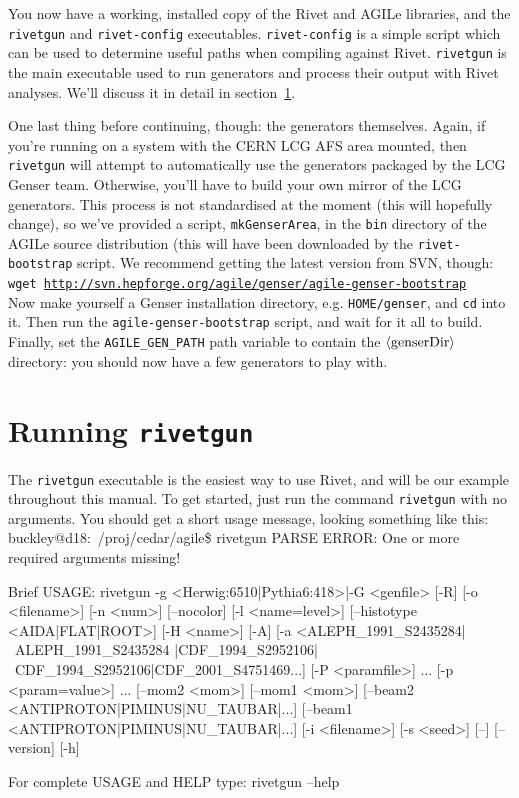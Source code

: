 \documentclass{JHEP3}
\newenvironment{snippet}{\Verbatim}{\endVerbatim}
\newcommand{\kbd}[1]{\texttt{#1}\xspace}
\newcommand{\inp}[1]{\textsf{\textdollar}\hspace{1mm}\texttt{#1}\xspace}
\newcommand{\var}[1]{\texttt{\textdollar{}#1}\xspace}
\newcommand{\val}[1]{\textit{\ensuremath{\langle\text{\textrm{#1}\/}\rangle}}\xspace}
\newcommand{\SectionRef}[1]{section~\ref{#1}}
\begin{document}
You now have a working, installed copy of the Rivet and AGILe libraries, and the
\kbd{rivetgun} and \kbd{rivet-config} executables. \kbd{rivet-config} is a
simple script which can be used to determine useful paths when compiling against
Rivet. \kbd{rivetgun} is the main executable used to run generators and process
their output with Rivet analyses. We'll discuss it in detail
in \SectionRef{sec:rivetgun}.

One last thing before continuing, though: the generators themselves. Again, if
you're running on a system with the CERN LCG AFS area mounted, then
\kbd{rivetgun} will attempt to automatically use the generators packaged by the
LCG Genser team. Otherwise, you'll have to build your own mirror of the LCG
generators. This process is not standardised at the moment (this will hopefully
change), so we've provided a script, \kbd{mkGenserArea}, in the \kbd{bin}
directory of the AGILe source distribution (this will have been downloaded by
the \kbd{rivet-bootstrap} script. We recommend getting the latest version from
SVN, though:\\
\inp{wget \url{http://svn.hepforge.org/agile/genser/agile-genser-bootstrap}}\\
Now make yourself a Genser installation directory, e.g. \kbd{\var{HOME}/genser},
and \kbd{cd} into it. Then run the \kbd{agile-genser-bootstrap} script, and wait
for it all to build. Finally, set the \var{AGILE_GEN_PATH} path variable to
contain the \kbd{\val{genserDir}} directory: you should now have a few
generators to play with.


\section{Running \kbd{rivetgun}}
\label{sec:rivetgun}
The \kbd{rivetgun} executable is the easiest way to use Rivet, and will be our
example throughout this manual. To get started, just run the command
\inp{rivetgun} with no arguments. You should get a short usage message, looking
something like this:
%
\begin{snippet}
buckley@d18:~/proj/cedar/agile\$ rivetgun
PARSE ERROR:  
             One or more required arguments missing!

Brief USAGE: 
   rivetgun  {-g <Herwig:6510|Pythia6:418>|-G <genfile>} [-R] 
             [-o <filename>] [-n <num>] [--nocolor] [-l <name=level>] 
             [--histotype <AIDA|FLAT|ROOT>] [-H <name>]
             [-A] [-a <ALEPH_1991_S2435284|~ALEPH_1991_S2435284
             |CDF_1994_S2952106|~CDF_1994_S2952106|CDF_2001_S4751469...]
             [-P <paramfile>] ...  [-p <param=value>] ...  [--mom2 <mom>]
             [--mom1 <mom>] [--beam2 <ANTIPROTON|PIMINUS|NU_TAUBAR|...]
             [--beam1 <ANTIPROTON|PIMINUS|NU_TAUBAR|...]
             [-i <filename>] [-s <seed>] [--] [--version] [-h]

For complete USAGE and HELP type: 
   rivetgun --help
\end{snippet}
\end{document}
